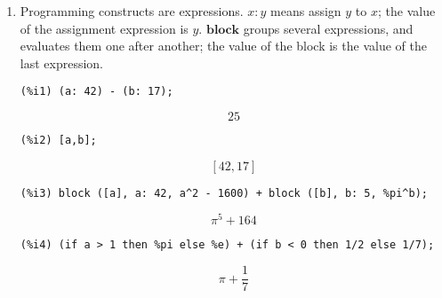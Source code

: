 \documentclass[12pt,leqno]{article}
\begin{document}
\begin{enumerate}
\begin{dmath}[number={\(\mathop{\mathrm{\%o}_{6}}\)}]
\begin{bmatrix}
\begin{bmatrix}
  1 & a\\
  b & 7
\end{bmatrix} & e
\end{bmatrix}
\end{dmath}
\begin{verbatim}
(%i7) M [2][1];
\end{verbatim}
\begin{dmath}[number={\(\mathop{\mathrm{\%o}_{7}}\)}]
29
\end{dmath}
\begin{verbatim}
(%i8) M2 [2][1];
\end{verbatim}
\begin{dmath}[number={\(\mathop{\mathrm{\%o}_{8}}\)}]
\begin{bmatrix}
  1 & a\\
  b & 7
\end{bmatrix}
\end{dmath}


\item Programming constructs are expressions.
$x : y$ means assign $y$ to $x$; the value of the assignment expression is $y$.
$\mathbf{block}$ groups several expressions, and evaluates them one after another;
the value of the block is the value of the last expression.
\begin{verbatim}
(%i1) (a: 42) - (b: 17);
\end{verbatim}
\begin{dmath}[number={\(\mathop{\mathrm{\%o}_{1}}\)}]
25
\end{dmath}
\begin{verbatim}
(%i2) [a,b];
\end{verbatim}
\begin{dmath}[number={\(\mathop{\mathrm{\%o}_{2}}\)}]
\left[42, 17\right]
\end{dmath}
\begin{verbatim}
(%i3) block ([a], a: 42, a^2 - 1600) + block ([b], b: 5, %pi^b);
\end{verbatim}
\begin{dmath}[number={\(\mathop{\mathrm{\%o}_{3}}\)}]
{\pi}^{5}+164
\end{dmath}
\begin{verbatim}
(%i4) (if a > 1 then %pi else %e) + (if b < 0 then 1/2 else 1/7);
\end{verbatim}
\begin{dmath}[number={\(\mathop{\mathrm{\%o}_{4}}\)}]
\pi+\frac{1}{7}
\end{dmath}



\end{enumerate}
\end{document}
